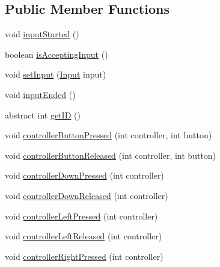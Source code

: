 \subsection*{Public Member Functions}
\begin{DoxyCompactItemize}
\item 
void \mbox{\hyperlink{classorg_1_1newdawn_1_1slick_1_1state_1_1_basic_game_state_aa746c5cf910eadbcb06bc5fc50030054}{input\+Started}} ()
\item 
boolean \mbox{\hyperlink{classorg_1_1newdawn_1_1slick_1_1state_1_1_basic_game_state_adc09c433d4eb497616ac73c55b8b6c7d}{is\+Accepting\+Input}} ()
\item 
void \mbox{\hyperlink{classorg_1_1newdawn_1_1slick_1_1state_1_1_basic_game_state_ae453e5cfaf7e00181a981ca4e25bb82e}{set\+Input}} (\mbox{\hyperlink{classorg_1_1newdawn_1_1slick_1_1_input}{Input}} input)
\item 
void \mbox{\hyperlink{classorg_1_1newdawn_1_1slick_1_1state_1_1_basic_game_state_a7bbd6fe017193ba107713e0e77c668f1}{input\+Ended}} ()
\item 
abstract int \mbox{\hyperlink{classorg_1_1newdawn_1_1slick_1_1state_1_1_basic_game_state_a781ce2b3d6dd9b9853adb011f5e75cf7}{get\+ID}} ()
\item 
void \mbox{\hyperlink{classorg_1_1newdawn_1_1slick_1_1state_1_1_basic_game_state_ace9fde4bc57f608d957efc97667b8a6d}{controller\+Button\+Pressed}} (int controller, int button)
\item 
void \mbox{\hyperlink{classorg_1_1newdawn_1_1slick_1_1state_1_1_basic_game_state_a46c12ac651bb0a6d442068b3b448b9c1}{controller\+Button\+Released}} (int controller, int button)
\item 
void \mbox{\hyperlink{classorg_1_1newdawn_1_1slick_1_1state_1_1_basic_game_state_a8783d6be13e8d476cb035af5e740803a}{controller\+Down\+Pressed}} (int controller)
\item 
void \mbox{\hyperlink{classorg_1_1newdawn_1_1slick_1_1state_1_1_basic_game_state_a8e728a45fed4846429f29299f4dba44f}{controller\+Down\+Released}} (int controller)
\item 
void \mbox{\hyperlink{classorg_1_1newdawn_1_1slick_1_1state_1_1_basic_game_state_ae506f3ea09df308d00e6253ca85cffc4}{controller\+Left\+Pressed}} (int controller)
\item 
void \mbox{\hyperlink{classorg_1_1newdawn_1_1slick_1_1state_1_1_basic_game_state_a71bbea4a21962a1a403e51f0ccd9a87c}{controller\+Left\+Released}} (int controller)
\item 
void \mbox{\hyperlink{classorg_1_1newdawn_1_1slick_1_1state_1_1_basic_game_state_adb19b887e058c5a01741e39fb8aed2fa}{controller\+Right\+Pressed}} (int controller)

\end{DoxyCompactItemize}
